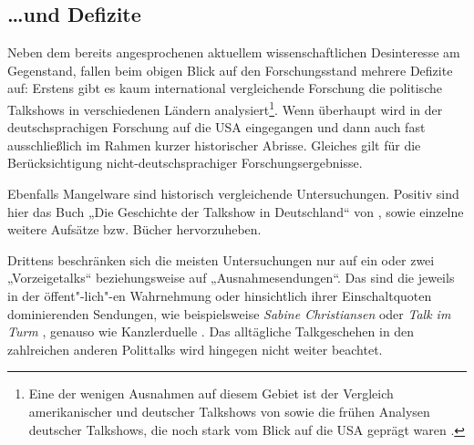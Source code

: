 \subsection{\ldots und Defizite}

Neben dem bereits angesprochenen aktuellem wissenschaftlichen Desinteresse am Gegenstand, fallen beim obigen Blick auf den Forschungsstand mehrere Defizite auf: Erstens gibt es kaum international vergleichende Forschung die politische Talkshows in verschiedenen Ländern analysiert\footnote{Eine der wenigen Ausnahmen auf diesem Gebiet ist der Vergleich amerikanischer und deutscher Talkshows von \textcite{krauseLocalTalkGlobal1995} sowie die frühen Analysen deutscher Talkshows, die noch stark vom Blick auf die USA geprägt waren \parencite{barloewenGrosseVorbildFernsehproduktion1975, barloewenGesellschaftlicheKontextTalk1975}.}. Wenn überhaupt wird in der deutschsprachigen Forschung auf die USA eingegangen und dann auch fast ausschließlich im Rahmen kurzer historischer Abrisse. Gleiches gilt für die Berücksichtigung nicht-deutschsprachiger Forschungsergebnisse.

Ebenfalls Mangelware sind historisch vergleichende Untersuchungen. Positiv sind hier das Buch „Die Geschichte der Talkshow in Deutschland“ von \textcite{kellerGeschichteTalkshowDeutschland2009}, sowie einzelne weitere Aufsätze bzw. Bücher \parencite{foltinZurEntwicklungTalkshow1990, foltinTalkshowGeschichteSchillernden1994, timbergTelevisionTalkHistory2002} hervorzuheben.

Drittens beschränken sich die meisten Untersuchungen nur auf ein oder zwei „Vorzeigetalks“ beziehungsweise auf „Ausnahmesendungen“. Das sind die jeweils in der öffent"-lich"-en Wahrnehmung oder hinsichtlich ihrer Einschaltquoten dominierenden Sendungen, wie beispielsweise \textit{Sabine Christiansen} oder \textit{Talk im Turm} \parencite{tenscherSabineChristiansenUnd1999}, genauso wie Kanzlerduelle \parencite{lippJournalistischeWahlkampfvermittlungAnalyse1983, bucherLogikPolitikLogik2007, schrottElefantenUnterSich1996}. Das alltägliche Talkgeschehen in den zahlreichen anderen Polittalks wird hingegen nicht weiter beachtet.

